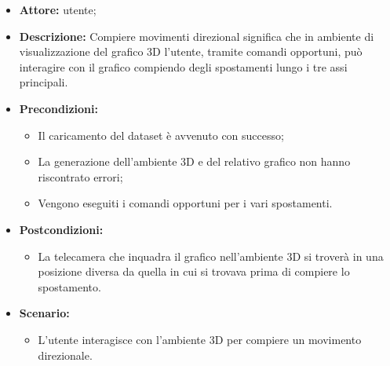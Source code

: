 \begin{itemize}    
    \item \textbf{Attore:} utente;
    \item \textbf{Descrizione:} Compiere movimenti direzional significa che in ambiente di visualizzazione del grafico 3D l'utente, 
    tramite comandi opportuni, può interagire con il grafico compiendo degli spostamenti lungo i tre assi principali.
    \item \textbf{Precondizioni:}    
        \begin{itemize}
            \item Il caricamento del dataset è avvenuto con successo;
            \item La generazione dell'ambiente 3D e del relativo grafico non hanno riscontrato errori;
            \item Vengono eseguiti i comandi opportuni per i vari spostamenti.
        \end{itemize}    
    \item \textbf{Postcondizioni:}
        \begin{itemize}
            \item La telecamera che inquadra il grafico nell'ambiente 3D si troverà in una posizione diversa da quella in cui si trovava prima di compiere lo spostamento.
        \end{itemize}    
    \item \textbf{Scenario:} 
        \begin{itemize}
            \item L'utente interagisce con l'ambiente 3D per compiere un movimento direzionale.
        \end{itemize}
\end{itemize}
